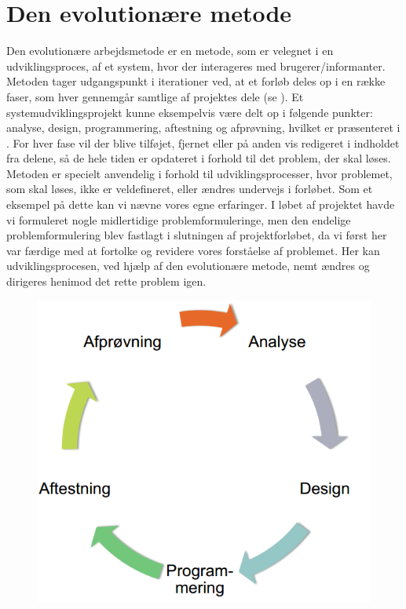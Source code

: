 \chapter{Den evolutionære metode}
\label{akademiskmetode}

Den evolutionære arbejdsmetode er en metode, som er velegnet i en udviklingsproces, af et system, hvor der interageres med brugerer/informanter. 
Metoden tager udgangspunkt i iterationer ved, at et forløb deles op i en række faser, som hver gennemgår samtlige af projektes dele (se ). 
Et systemudviklingsprojekt kunne eksempelvis være delt op i følgende punkter: analyse, design, programmering, aftestning og afprøvning, hvilket er præsenteret i .
For hver fase vil der blive tilføjet, fjernet eller på anden vis redigeret i indholdet fra delene, så de hele tiden er opdateret i forhold til det problem, der skal løses. 
Metoden er specielt anvendelig i forhold til udviklingsprocesser, hvor problemet, som skal løses, ikke er veldefineret, eller ændres undervejs i forløbet. 
Som et eksempel på dette kan vi nævne vores egne erfaringer. I løbet af projektet havde vi formuleret nogle midlertidige problemformuleringe, men den endelige problemformulering blev fastlagt i slutningen af projektforløbet, da vi først her var færdige med at fortolke og revidere vores forståelse af problemet.
Her kan udviklingsprocesen, ved hjælp af den evolutionære metode, nemt ændres og dirigeres henimod det rette problem igen.

\begin{figure}[ht]
	\centering
	\includegraphics[scale=0.5]{billeder/evolutionaeremetode.png}
	\label{fig:evolutionaeremetode}
  \end{figure}

